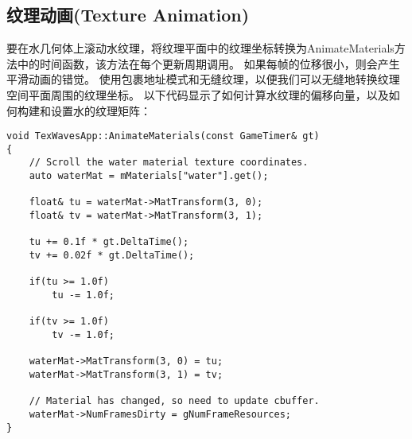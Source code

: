 \subsection{纹理动画(Texture Animation)}
\begin{flushleft}
要在水几何体上滚动水纹理，将纹理平面中的纹理坐标转换为AnimateMaterials方法中的时间函数，该方法在每个更新周期调用。 如果每帧的位移很小，则会产生平滑动画的错觉。 使用包裹地址模式和无缝纹理，以便我们可以无缝地转换纹理空间平面周围的纹理坐标。 以下代码显示了如何计算水纹理的偏移向量，以及如何构建和设置水的纹理矩阵：\\
\end{flushleft}

\begin{lstlisting}
void TexWavesApp::AnimateMaterials(const GameTimer& gt)
{
    // Scroll the water material texture coordinates.
    auto waterMat = mMaterials["water"].get();

    float& tu = waterMat->MatTransform(3, 0);
    float& tv = waterMat->MatTransform(3, 1);

    tu += 0.1f * gt.DeltaTime();
    tv += 0.02f * gt.DeltaTime();

    if(tu >= 1.0f)
        tu -= 1.0f;

    if(tv >= 1.0f)
        tv -= 1.0f;

    waterMat->MatTransform(3, 0) = tu;
    waterMat->MatTransform(3, 1) = tv;

    // Material has changed, so need to update cbuffer.
    waterMat->NumFramesDirty = gNumFrameResources;
}
\end{lstlisting}


